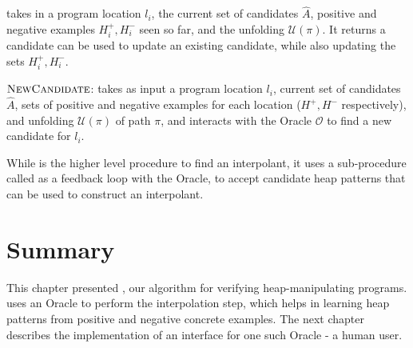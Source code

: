 \newcandidate takes in a program location $l_i$, the current set of candidates $\hat{A}$, positive and negative examples $H_i^{+}, H_i^{-}$ seen so far, and the unfolding $\mathcal{U}(\pi)$. It returns a candidate can be used to update an existing candidate, while also updating the sets $H_i^{+}, H_i^{-}$.

\begin{algorithm}[ht]


  \caption{$\textsc{NewCandidate}$: takes as input a program location $l_i$, current set of candidates $\hat{A}$, sets of positive and negative examples for each location ($H^{+}, H^{-}$ respectively), and unfolding $\mathcal{U}(\pi)$ of path $\pi$, and interacts with the Oracle $\mathcal{O}$ to find a new candidate for $l_i$.}
  \label{alg:newcandidate}
\end{algorithm}

While \seplearner is the higher level procedure to find an interpolant, it uses a sub-procedure called \newcandidate as a feedback loop with the Oracle, to accept candidate heap patterns that can be used to construct an interpolant.

\section*{Summary}
This chapter presented \verifier, our algorithm for verifying heap-manipulating programs. \verifier uses an Oracle to perform the interpolation step, which helps in learning heap patterns from positive and negative concrete examples. The next chapter describes the implementation of an interface for one such Oracle - a human user.